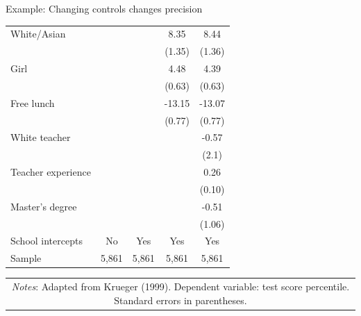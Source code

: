 \documentclass{beamer} %
\def\sym#1{\ifmmode^{#1}\else\(^{#1}\)\fi} %
\begin{document}
\begin{frame}{Example: Changing controls changes precision}
\begin{table}[htbp]
\begin{center}
\begin{tabular*}{0.7\linewidth}{@{\hskip\tabcolsep\extracolsep\fill}l*{4}{c}@{}}
White/Asian	&		&		&	8.35	&	8.44	\\
	&		&		&	(1.35)	&	(1.36)	\\
Girl	&		&		&	4.48	&	4.39	\\
	&		&		&	(0.63)	&	(0.63)	\\
Free lunch	&		&		&	 -13.15	&	 -13.07	\\
	&		&		&	(0.77)	&	(0.77)	\\
White teacher	&		&		&		&	-0.57	\\
	&		&		&		&	(2.1)	\\
Teacher experience	&		&		&		&	0.26	\\
	&		&		&		&	(0.10)	\\
Master's degree	&		&		&		&	-0.51	\\
	&		&		&		&	(1.06)	\\
\midrule											
School intercepts	&	No	&	Yes	&	Yes	&	Yes	\\
Sample 	&	 5,861 	&	 5,861 	&	 5,861 	&	 5,861 	\\
\bottomrule													
\end{tabular*}
\begin{tabular*}{0.7\linewidth}{@{\hskip\tabcolsep\extracolsep\fill}ccc}
\multicolumn{3}{p{0.7\linewidth}}{\tiny \emph{Notes}: Adapted from Krueger (1999). Dependent variable: test score percentile. \colorbox[rgb]{1,1,0}{Standard errors in parentheses.}
}    

\\
\end{tabular*}	
\end{center}
\vspace{-0.2cm}
\normalsize
\end{table}


\end{frame}
\end{document}
